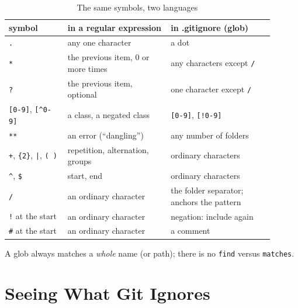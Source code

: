 \documentclass[11pt,a4paper]{article}
\begin{document}
\begin{table}[h]
\centering\small
\begin{tabular}{@{}L{0.2\linewidth}L{0.35\linewidth}L{0.35\linewidth}@{}}
  \toprule
  \textbf{symbol}           & \textbf{in a regular expression}           & \textbf{in .gitignore (glob)} \\
  \midrule
  \texttt{.}                & any one character                         & a dot \\
  \texttt{*}                & the previous item, 0 or more times        & any characters except \texttt{/} \\
  \texttt{?}                & the previous item, optional               & one character except \texttt{/} \\
  \texttt{[0-9]}, \texttt{[\textasciicircum 0-9]} & a class, a negated class & \texttt{[0-9]}, \texttt{[!0-9]} \\
  \texttt{**}               & an error (``dangling'')                   & any number of folders \\
  \texttt{+}, \texttt{\{2\}}, \texttt{|}, \texttt{( )} & repetition, alternation, groups & ordinary characters \\
  \texttt{\textasciicircum}, \texttt{\$} & start, end                   & ordinary characters \\
  \texttt{/}                & an ordinary character                     & the folder separator; anchors the pattern \\
  \texttt{!} at the start   & an ordinary character                     & negation: include again \\
  \texttt{\#} at the start  & an ordinary character                     & a comment \\
  \bottomrule
\end{tabular}
\caption{The same symbols, two languages}
\end{table}%

A glob always matches a \emph{whole} name (or path); there is no \texttt{find} versus \texttt{matches}.



\section{Seeing What Git Ignores}
\end{document}
